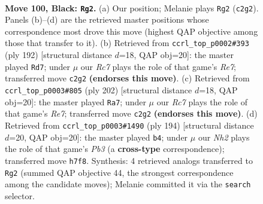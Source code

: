 \documentclass[11pt]{article}
\begin{document}
\clearpage

\begin{figure}[p]\centering
\begin{subfigure}{0.46\textwidth}\centering
\resizebox{\linewidth}{!}{%
\newchessgame
\chessboard[
  setfen={R7/7n/7p/4p2k/3p3b/1K6/2r5/8 b - - 19 100},
  showmover=false,
  pgfstyle=straightmove, color=movearrow, markmove={c2-g2}
]}
\caption{}
\end{subfigure}\hfill
\begin{subfigure}{0.46\textwidth}\centering
\resizebox{\linewidth}{!}{%
\newchessgame
\chessboard[
  setfen={5k2/4R3/5P2/5K2/5P2/8/8/r7 w - - 35 97},
  showmover=false,
  pgfstyle=straightmove, color=movearrow, markmove={e7-d7}
]}
\caption{}
\end{subfigure}
\\[4pt]
\begin{subfigure}{0.46\textwidth}\centering
\resizebox{\linewidth}{!}{%
\newchessgame
\chessboard[
  setfen={5k2/4R3/5P2/5K2/5P2/2r5/8/8 w - - 47 102},
  showmover=false,
  pgfstyle=straightmove, color=movearrow, markmove={e7-a7}
]}
\caption{}
\end{subfigure}\hfill
\begin{subfigure}{0.46\textwidth}\centering
\resizebox{\linewidth}{!}{%
\newchessgame
\chessboard[
  setfen={8/5k2/4R3/5K2/5P2/1P6/3r4/8 w - - 5 98},
  showmover=false,
  pgfstyle=straightmove, color=movearrow, markmove={b3-b4}
]}
\caption{}
\end{subfigure}
\caption{\textbf{Move 100, Black: \texttt{Rg2}.} (a) Our position; Melanie plays \texttt{Rg2} (\texttt{c2g2}). Panels (b)--(d) are the retrieved master positions whose correspondence most drove this move (highest QAP objective among those that transfer to it). (b) Retrieved from \texttt{ccrl\_top\_p0002\#393} (ply 192) [structural distance $d$=18, QAP obj=20]: the master played \texttt{Rd7}; under $\mu$ our \emph{Rc7} plays the role of that game's \emph{Re7}; transferred move \texttt{c2g2} \textbf{(endorses this move)}. (c) Retrieved from \texttt{ccrl\_top\_p0003\#805} (ply 202) [structural distance $d$=18, QAP obj=20]: the master played \texttt{Ra7}; under $\mu$ our \emph{Rc7} plays the role of that game's \emph{Re7}; transferred move \texttt{c2g2} \textbf{(endorses this move)}. (d) Retrieved from \texttt{ccrl\_top\_p0003\#1490} (ply 194) [structural distance $d$=20, QAP obj=20]: the master played \texttt{b4}; under $\mu$ our \emph{Nh2} plays the role of that game's \emph{Pb3} (a \textbf{cross-type} correspondence); transferred move \texttt{h7f8}. Synthesis: 4 retrieved analogs transferred to \texttt{Rg2} (summed QAP objective 44, the strongest correspondence among the candidate moves); Melanie committed it via the \texttt{search} selector.}
\label{fig:thought-m199}
\end{figure}
\end{document}
